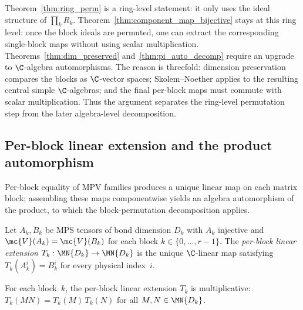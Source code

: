 \begin{remark}\label{rem:ring_vs_alg}
    Theorem~\ref{thm:ring_perm} is a ring-level statement: it only uses the
    ideal structure of $\prod_k R_k$.
    Theorem~\ref{thm:component_map_bijective} stays at this ring level: once the
    block ideals are permuted, one can extract the corresponding single-block
    maps without using scalar multiplication.
    Theorems~\ref{thm:dim_preserved}
    and~\ref{thm:pi_auto_decomp} require an upgrade to $\C$-algebra
    automorphisms. The reason is threefold: dimension preservation compares
    the blocks as $\C$-vector spaces; Skolem--Noether applies to the resulting
    central simple $\C$-algebras; and the final per-block maps must commute
    with scalar multiplication. Thus the argument separates the ring-level
    permutation step from the later algebra-level decomposition.
\end{remark}

\subsection{Per-block linear extension and the product automorphism}

Per-block equality of MPV families produces a unique linear map on each
matrix block; assembling these maps componentwise yields an algebra
automorphism of the product, to which the block-permutation decomposition
applies.

\begin{definition}%
    \label{def:perBlockLinearExtension}
    \leanok
    Let $A_k, B_k$ be MPS tensors of bond dimension $D_k$ with
    $A_k$ injective and $\mc{V}(A_k) = \mc{V}(B_k)$ for each block
    $k \in \{0, \ldots, r{-}1\}$.
    The \emph{per-block linear extension} $T_k : \MN{D_k} \to \MN{D_k}$
    is the unique $\C$-linear map satisfying $T_k(A_k^i) = B_k^i$
    for every physical index~$i$.
\end{definition}

\begin{lemma}%
    \label{lem:perBlockLinearExtension_mul}
    \leanok
    For each block~$k$, the per-block linear extension $T_k$ is
    multiplicative:
    $T_k(MN) = T_k(M)\, T_k(N)$ for all $M, N \in \MN{D_k}$.
\end{lemma}


